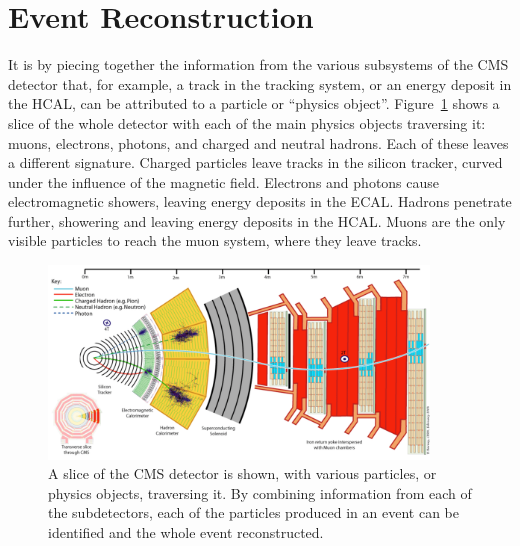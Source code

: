 \newpage
\section{Event Reconstruction} \label{sec:CMSreco}

It is by piecing together the information from the various subsystems of the \ac{CMS} detector that, for example, a track in the tracking system, or an energy deposit in the \ac{HCAL}, can be attributed to a particle or ``physics object''. 
Figure~\ref{fig:CMSslice} shows a slice of the whole detector with each of the main physics objects traversing it: muons, electrons, photons, and charged and neutral hadrons.
Each of these leaves a different signature.
Charged particles leave tracks in the silicon tracker, curved under the influence of the magnetic field.
Electrons and photons cause electromagnetic showers, leaving energy deposits in the \ac{ECAL}.
Hadrons penetrate further, showering and leaving energy deposits in the \ac{HCAL}. 
Muons are the only visible particles to reach the muon system, where they leave tracks.

\begin{figure}[htbp]
  \begin{center}
  \includegraphics[width=0.9\textwidth]{Figures/detector/CMS_Slice.pdf}
  \caption{A slice of the \ac{CMS} detector is shown, with various particles, or physics objects, traversing it. By combining information from each of the subdetectors, each of the particles produced in an event can be identified and the whole event reconstructed.
}
  \label{fig:CMSslice}
  \end{center}
\end{figure}

